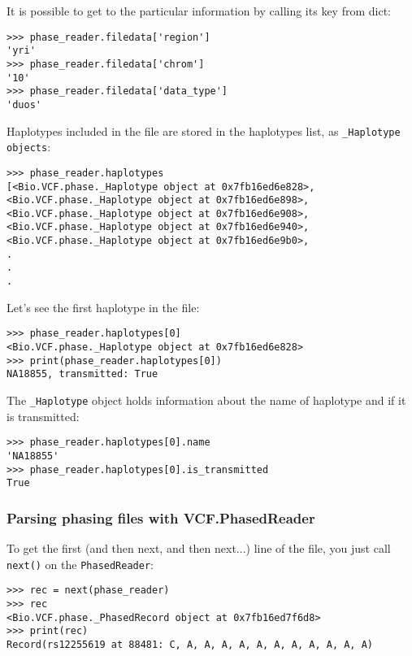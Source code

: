 \noindent It is possible to get to the particular information by calling its key from dict:

\begin{verbatim}
>>> phase_reader.filedata['region']
'yri'
>>> phase_reader.filedata['chrom']
'10'
>>> phase_reader.filedata['data_type']
'duos'

\end{verbatim}

\noindent Haplotypes included in the file are stored in the haplotypes list, as \verb|_Haplotype objects|:

\begin{verbatim}
>>> phase_reader.haplotypes
[<Bio.VCF.phase._Haplotype object at 0x7fb16ed6e828>,
<Bio.VCF.phase._Haplotype object at 0x7fb16ed6e898>,
<Bio.VCF.phase._Haplotype object at 0x7fb16ed6e908>,
<Bio.VCF.phase._Haplotype object at 0x7fb16ed6e940>,
<Bio.VCF.phase._Haplotype object at 0x7fb16ed6e9b0>,
.
.
.

\end{verbatim}

\noindent Let's see the first haplotype in the file:

\begin{verbatim}
>>> phase_reader.haplotypes[0]
<Bio.VCF.phase._Haplotype object at 0x7fb16ed6e828>
>>> print(phase_reader.haplotypes[0])
NA18855, transmitted: True

\end{verbatim}

\noindent The \verb|_Haplotype| object holds information about the name of haplotype and if it is transmitted:

\begin{verbatim}
>>> phase_reader.haplotypes[0].name
'NA18855'
>>> phase_reader.haplotypes[0].is_transmitted
True

\end{verbatim}

\subsubsection{Parsing phasing files with VCF.PhasedReader}

\noindent To get the first (and then next, and then next...) line of the file, you just call \verb|next()| on the \verb|PhasedReader|:

\begin{verbatim}
>>> rec = next(phase_reader)
>>> rec
<Bio.VCF.phase._PhasedRecord object at 0x7fb16ed7f6d8>
>>> print(rec)
Record(rs12255619 at 88481: C, A, A, A, A, A, A, A, A, A, A, A)

\end{verbatim}

